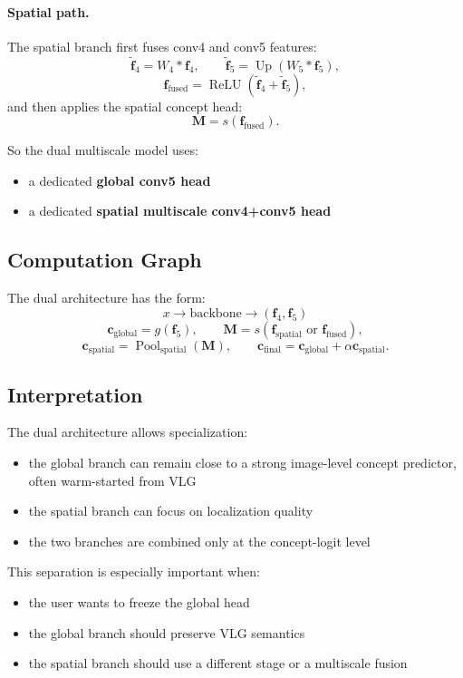 \documentclass[11pt]{article}
\begin{document}
\paragraph{Spatial path.}
The spatial branch first fuses conv4 and conv5 features:
\[
\tilde{\mathbf{f}}_4 = W_4 * \mathbf{f}_4,
\qquad
\tilde{\mathbf{f}}_5 = \operatorname{Up}(W_5 * \mathbf{f}_5),
\]
\[
\mathbf{f}_{\mathrm{fused}}
=
\operatorname{ReLU}(\tilde{\mathbf{f}}_4 + \tilde{\mathbf{f}}_5),
\]
and then applies the spatial concept head:
\[
\mathbf{M} = s(\mathbf{f}_{\mathrm{fused}}).
\]

So the dual multiscale model uses:
\begin{itemize}
    \item a dedicated \textbf{global conv5 head}
    \item a dedicated \textbf{spatial multiscale conv4+conv5 head}
\end{itemize}

\subsection{Computation Graph}
The dual architecture has the form:
\[
x \rightarrow \text{backbone} \rightarrow (\mathbf{f}_4,\mathbf{f}_5)
\]
\[
\mathbf{c}_{\mathrm{global}} = g(\mathbf{f}_5),
\qquad
\mathbf{M} = s(\mathbf{f}_{\mathrm{spatial}} \text{ or } \mathbf{f}_{\mathrm{fused}}),
\]
\[
\mathbf{c}_{\mathrm{spatial}}
=
\operatorname{Pool}_{\mathrm{spatial}}(\mathbf{M}),
\qquad
\mathbf{c}_{\mathrm{final}}
=
\mathbf{c}_{\mathrm{global}} + \alpha \mathbf{c}_{\mathrm{spatial}}.
\]

\subsection{Interpretation}
The dual architecture allows specialization:
\begin{itemize}
    \item the global branch can remain close to a strong image-level concept
    predictor, often warm-started from VLG
    \item the spatial branch can focus on localization quality
    \item the two branches are combined only at the concept-logit level
\end{itemize}

This separation is especially important when:
\begin{itemize}
    \item the user wants to freeze the global head
    \item the global branch should preserve VLG semantics
    \item the spatial branch should use a different stage or a multiscale fusion
\end{itemize}
\end{document}
